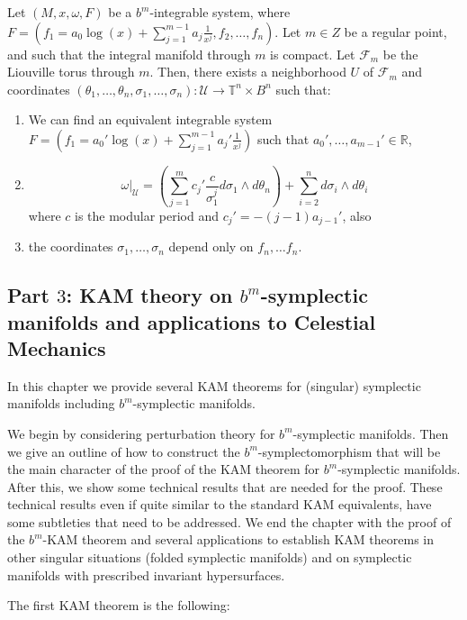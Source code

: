 \begin{theoremA}
Let $(M,x,\omega,F)$ be a $b^m$-integrable system, where $F = (f_1 = a_0 \log(x) + \sum_{j=1}^{m-1} a_j\frac{1}{x^j}, f_2,\ldots,f_n)$. Let $m\in Z$ be a regular point, and such that the integral manifold through $m$ is compact. Let $\mathcal{F}_m$ be the Liouville torus through $m$.
Then, there exists a neighborhood $U$ of $\mathcal{F}_m$ and coordinates $(\theta_1,\ldots,\theta_n,\sigma_1,\ldots,\sigma_n):\mathcal{U}\rightarrow\mathbb{T}^n\times B^n$ such that:

\begin{enumerate}
\item We can find an equivalent integrable system $F = (f_1 = a_0'\log(x) + \sum_{j=1}^{m-1} a_j'\frac{1}{x^j})$ such that $a_0',\ldots, a_{m-1}' \in \mathbb{R}$,
\item $$\omega|_\mathcal{U} = \left(\sum_{j=1}^m c_j'\frac{c}{\sigma_1^j}d\sigma_1\wedge d\theta_n\right) + \sum_{i=2}^{n} d \sigma_i\wedge d\theta_i$$ where $c$ is the modular period and $c_j' = -(j-1)a_{j-1}'$, also
\item the coordinates $\sigma_1,\ldots,\sigma_n$ depend only on $f_n,\ldots f_n$.
\end{enumerate}

\end{theoremA}

\subsection{Part $3$: KAM theory on $b^m$-symplectic manifolds and applications to Celestial Mechanics}
In this chapter we provide several  KAM theorems for (singular) symplectic manifolds including $b^m$-symplectic manifolds.

 We begin by considering perturbation theory for $b^m$-symplectic manifolds. Then we give an outline of how to construct the $b^m$-symplectomorphism that will be the main character of the proof of the KAM theorem for $b^m$-symplectic manifolds. After this, we show some technical results that are needed for the proof. These technical results even if quite similar to the standard KAM equivalents, have some subtleties that need to be addressed. We end the chapter with the proof of the $b^m$-KAM theorem and several applications to establish KAM theorems in other singular situations (folded symplectic manifolds) and on symplectic manifolds with prescribed invariant hypersurfaces.

The first KAM theorem is the following:

